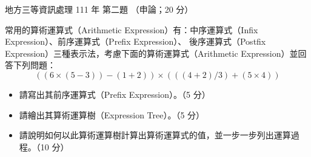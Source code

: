 \begin{pastexam}[label={px:df3-111-ds-02}]{地方三等資訊處理 111 年 第二題}
（申論；20 分）

常用的算術運算式（Arithmetic Expression）有：中序運算式（Infix Expression）、前序運算式（Prefix Expression）、
後序運算式（Postfix Expression）三種表示法，考慮下面的算術運算式（Arithmetic Expression）並回答下列問題：
\[
((6 \times (5 - 3)) - (1 + 2)) \times (((4 + 2) / 3) + (5 \times 4))
\]
\begin{itemize}[leftmargin=2.2em, nosep]
\item[㈠] 請寫出其前序運算式（Prefix Expression）。（5 分）
\item[㈡] 請繪出其算術運算樹（Expression Tree）。（5 分）
\item[㈢] 請說明如何以此算術運算樹計算出算術運算式的值，並一步一步列出運算過程。（10 分）
\end{itemize}
\end{pastexam}

